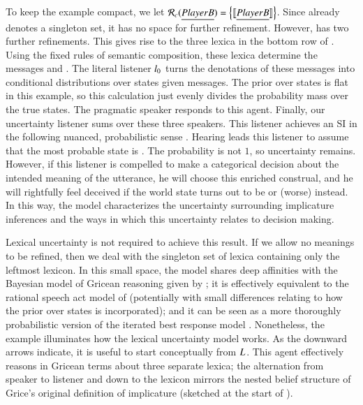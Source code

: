\documentclass[leqno,12pt]{article}
\begin{document}

To keep the example compact, we let
$\mathcal{R}_{c}(\emph{Player B}) = \left\{ \llbracket\emph{Player B}\rrbracket \right\}$. Since
 already denotes a singleton set, it has no space for
further refinement. However,  has two further
refinements. This gives rise to the three lexica in the bottom row of
.  Using the fixed rules of semantic
composition, these lexica determine the messages  and . The literal listener
$l_{0}$ turns the denotations of these messages into
conditional distributions over states given messages. The prior over
states is flat in this example, so this calculation just evenly
divides the probability mass over the true states. The pragmatic
speaker responds to this agent. Finally, our uncertainty listener sums
over these three speakers. This listener achieves an SI in the
following nuanced, probabilistic sense
. Hearing  leads this
listener to assume that the most probable state is . The
probability is not $1$, so uncertainty remains. However, if this
listener is compelled to make a categorical decision about the
intended meaning of the utterance, he will choose this enriched
construal, and he will rightfully feel deceived if the world state
turns out to be  or (worse)  instead. In this way,
the model characterizes the uncertainty surrounding implicature
inferences \citep{Hirschberg85} and the ways in which this uncertainty
relates to decision making.

Lexical uncertainty is not required to achieve this result. If we
allow no meanings to be refined, then we deal with the singleton set
of lexica containing only the leftmost lexicon. In this small space,
the model shares deep affinities with the Bayesian model of Gricean
reasoning given by \citet{Russell:2012}; it is effectively equivalent
to the rational speech act model of \citet{Frank:Goodman:2012}
(potentially with small differences relating to how the prior over
states is incorporated); and it can be seen as a more thoroughly
probabilistic version of the iterated best response model
\citep{Franke09DISS,Jaeger:2007,Jaeger:2011}. Nonetheless, the example
illuminates how the lexical uncertainty model works. As the downward
arrows indicate, it is useful to start conceptually from
$L_{}$. This agent effectively reasons in Gricean
terms about three separate lexica; the alternation from speaker to
listener and down to the lexicon mirrors the nested belief structure
of Grice's original definition of implicature (sketched at the start
of ).
\end{document}
